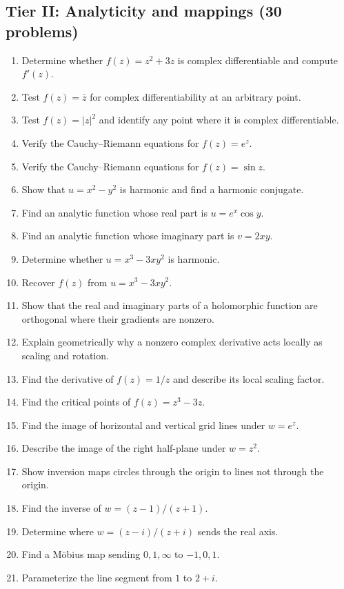 \subsection*{Tier II: Analyticity and mappings (30 problems)}
\begin{enumerate}[label=\textbf{\arabic*.},leftmargin=*]
\item Determine whether $f(z)=z^2+3z$ is complex differentiable and compute $f'(z)$.
\item Test $f(z)=\bar z$ for complex differentiability at an arbitrary point.
\item Test $f(z)=|z|^2$ and identify any point where it is complex differentiable.
\item Verify the Cauchy--Riemann equations for $f(z)=e^z$.
\item Verify the Cauchy--Riemann equations for $f(z)=\sin z$.
\item Show that $u=x^2-y^2$ is harmonic and find a harmonic conjugate.
\item Find an analytic function whose real part is $u=e^x\cos y$.
\item Find an analytic function whose imaginary part is $v=2xy$.
\item Determine whether $u=x^3-3xy^2$ is harmonic.
\item Recover $f(z)$ from $u=x^3-3xy^2$.
\item Show that the real and imaginary parts of a holomorphic function are orthogonal where their gradients are nonzero.
\item Explain geometrically why a nonzero complex derivative acts locally as scaling and rotation.
\item Find the derivative of $f(z)=1/z$ and describe its local scaling factor.
\item Find the critical points of $f(z)=z^3-3z$.
\item Find the image of horizontal and vertical grid lines under $w=e^z$.
\item Describe the image of the right half-plane under $w=z^2$.
\item Show inversion maps circles through the origin to lines not through the origin.
\item Find the inverse of $w=(z-1)/(z+1)$.
\item Determine where $w=(z-i)/(z+i)$ sends the real axis.
\item Find a Möbius map sending $0,1,\infty$ to $-1,0,1$.
\item Parameterize the line segment from $1$ to $2+i$.

\end{enumerate}
